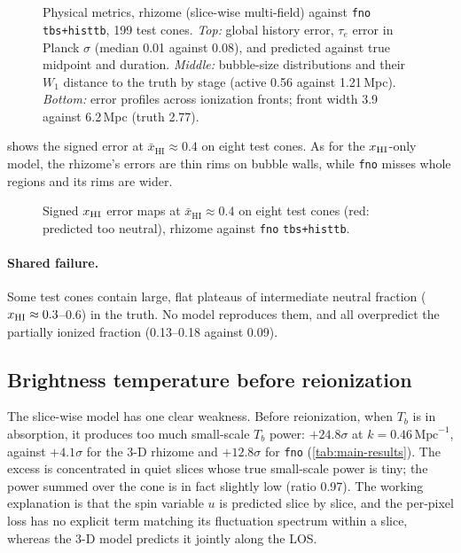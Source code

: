 \begin{figure}[!tp]
  \centering
  \\[4pt]
  \\[4pt]
  \caption{Physical metrics, rhizome (slice-wise multi-field) against \texttt{fno} \texttt{tbs+histtb}, 199 test cones. \emph{Top:} global history error, $\tau_e$ error in Planck $\sigma$ (median 0.01 against 0.08), and predicted against true midpoint and duration. \emph{Middle:} bubble-size distributions and their $W_1$ distance to the truth by stage (active 0.56 against 1.21\,Mpc). \emph{Bottom:} error profiles across ionization fronts; front width 3.9 against 6.2\,Mpc (truth 2.77).}
  \label{fig:h2h-physical}
\end{figure}

 shows the signed error at $\bar x_{\mathrm{HI}}\approx0.4$ on eight test cones. As for the $x_{\mathrm{HI}}$-only model, the rhizome's errors are thin rims on bubble walls, while \texttt{fno} misses whole regions and its rims are wider.

\begin{figure}[!htbp]
  \centering
  \caption{Signed $x_{\mathrm{HI}}$ error maps at $\bar x_{\mathrm{HI}}\approx0.4$ on eight test cones (red: predicted too neutral), rhizome against \texttt{fno} \texttt{tbs+histtb}.}
  \label{fig:h2h-errors}
\end{figure}

\paragraph{Shared failure.} Some test cones contain large, flat plateaus of intermediate neutral fraction ($x_{\mathrm{HI}}\approx0.3$--0.6) in the truth. No model reproduces them, and all overpredict the partially ionized fraction (0.13--0.18 against 0.09).

\subsection{Brightness temperature before reionization}
\label{sec:results-absorption}

The slice-wise model has one clear weakness. Before reionization, when $T_b$ is in absorption, it produces too much small-scale $T_b$ power: $+24.8\sigma$ at $k=0.46\,\mathrm{Mpc}^{-1}$, against $+4.1\sigma$ for the 3-D rhizome and $+12.8\sigma$ for \texttt{fno} (\cref{tab:main-results}). The excess is concentrated in quiet slices whose true small-scale power is tiny; the power summed over the cone is in fact slightly low (ratio 0.97). The working explanation is that the spin variable $u$ is predicted slice by slice, and the per-pixel loss has no explicit term matching its fluctuation spectrum within a slice, whereas the 3-D model predicts it jointly along the LOS.

